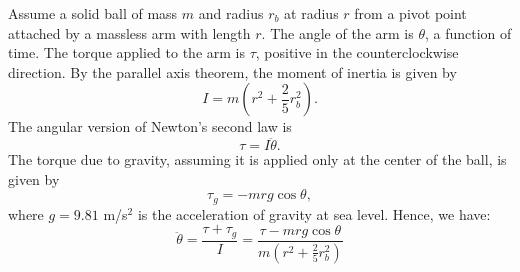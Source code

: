 \documentclass[pdftex]{book}
\begin{document}
\thispagestyle{empty}
\begin{center}
\end{center}
Assume a solid ball of mass $m$ and radius $r_b$
at radius $r$ from a pivot point attached by a massless arm with length $r$.
The angle of the arm is $\theta$, a function of time.
The torque applied to the arm is $\tau$, positive in the counterclockwise direction.
By the parallel axis theorem, the moment of inertia is given by
\[
I = m \left(r^2 + \frac{2}{5} r_b^2\right).
\]
The angular version of Newton's second law is
\[
\tau = I \ddot{\theta} .
\]
The torque due to gravity, assuming it is applied only at the center of the ball, is given by
\[
\tau_g = - mrg \cos \theta,
\]
where $g = 9.81$ m/s$^2$ is the acceleration of gravity at sea level.
Hence, we have:
\[
\ddot{\theta} = \frac{\tau + \tau_g}{I} = \frac{\tau - m r g \cos \theta}{m \left(r^2 + \frac{2}{5} r_b^2\right)}
\]
\end{document}
